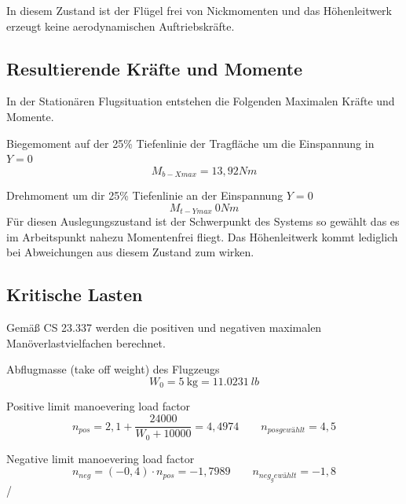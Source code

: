 In diesem Zustand ist der Flügel frei von Nickmomenten und das Höhenleitwerk erzeugt keine aerodynamischen Auftriebskräfte.

\subsection{Resultierende Kräfte und Momente}
\label{Resultierende Kräfte und Momenten Stationär}

In der Stationären Flugsituation entstehen die Folgenden Maximalen Kräfte und Momente.

Biegemoment auf der 25\% Tiefenlinie der Tragfläche um die Einspannung in $Y = 0$
\begin{equation}
M_{b-X max} = 13,92 Nm    
\end{equation}

Drehmoment  um dir 25\% Tiefenlinie an der Einspannung $Y = 0$
\begin{equation}
M_{t-Y max} ~ 0 Nm
\end{equation}
Für diesen Auslegungszustand ist der Schwerpunkt des Systems so gewählt das es im Arbeitspunkt nahezu Momentenfrei fliegt. Das Höhenleitwerk kommt lediglich bei Abweichungen aus diesem Zustand zum wirken.

\subsection{Kritische Lasten}

Gemäß CS 23.337 werden die positiven und negativen maximalen Manöverlastvielfachen berechnet.

Abflugmasse (take off weight) des Flugzeugs
\begin{equation}
\label{eq:K1}
W_{0} = \SI{5}{\kilogram} = \SI{11,0231}{lb}
\end{equation}

Positive limit manoevering load factor
\begin{equation}
\label{eq:K2}
n_{pos} = 2,1 + \frac{24000}{W_{0}+10000} = 4,4974 \qquad n_{pos gewählt}=4,5
\end{equation}

Negative limit manoevering load factor
\begin{equation}
\label{eq:K3}
n_{neg} = (-0,4) \cdot n_{pos} = -1,7989 \qquad n_{neg_gewählt}=-1,8
\end{equation}/%

